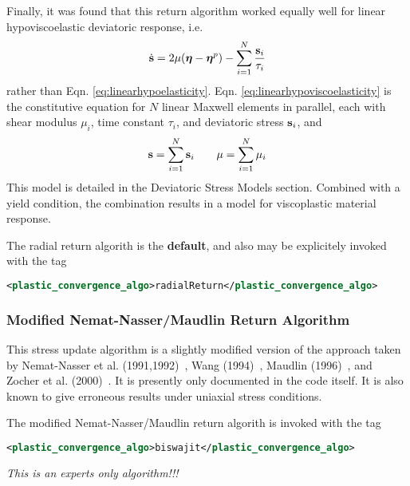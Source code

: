 Finally, it was found that this return algorithm worked equally well
for linear hypoviscoelastic deviatoric response, i.e.
  \begin{equation}\label{eq:linearhypoviscoelasticity}
    \dot{\mathbf{s}} = 2\mu(\boldsymbol{\eta} - \boldsymbol{\eta}^p) - \sum_{i=1}^N {\mathbf{s}_i\over \tau_i}
  \end{equation}
rather than Eqn. \ref{eq:linearhypoelasticity}.
Eqn. \ref{eq:linearhypoviscoelasticity} is the constitutive equation
for $N$ linear Maxwell elements in parallel, each with shear modulus
$\mu_i$, time constant $\tau_i$, and deviatoric stress $\mathbf{s}_i$, and
  \begin{equation}
    \mathbf{s} = \sum_{i=1}^N \mathbf{s}_i \quad\quad \mu = \sum_{i=1}^N \mu_i
  \end{equation}
This model is detailed in the Deviatoric Stress Models section.
Combined with a yield condition, the combination results in a
model for viscoplastic material response.

The radial return algorith is the {\bf default}, and also may be
explicitely invoked with the tag
  \begin{lstlisting}[language=XML]
    <plastic_convergence_algo>radialReturn</plastic_convergence_algo>
  \end{lstlisting}

\subsubsection{Modified Nemat-Nasser/Maudlin Return Algorithm}

This stress update algorithm is a slightly modified version of the
approach taken by Nemat-Nasser et
al. (1991,1992)~\cite{Nemat91,Nemat92}, Wang (1994)~\cite{Wang94},
Maudlin (1996)~\cite{Maudlin96}, and Zocher et
al. (2000)~\cite{Zocher00}.  It is presently only documented in the
code itself.  It is also known to give erroneous results under uniaxial
stress conditions.

The modified Nemat-Nasser/Maudlin return algorith is invoked with
the tag
  \begin{lstlisting}[language=XML]
    <plastic_convergence_algo>biswajit</plastic_convergence_algo>
  \end{lstlisting}
{\it This is an experts only algorithm!!!}

